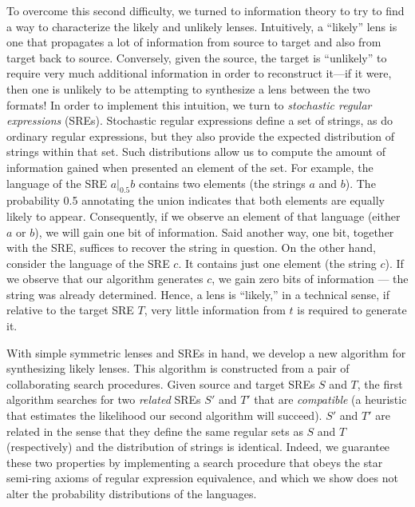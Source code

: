 \documentclass[acmsmall,screen,anonymous]{acmart}
\begin{document}
To overcome this second difficulty, we turned to information theory
to try to find a way to characterize the likely and unlikely lenses.  Intuitively, a ``likely'' lens
is one that propagates a lot of information from source to target and also from target
back to source.  Conversely, given the source, the target is ``unlikely'' to require very much
additional information in order to reconstruct it---if it were, then one is unlikely to
be attempting to synthesize a lens between the two formats!  In order to implement
this intuition, we turn to \emph{stochastic regular expressions} (SREs).
Stochastic regular expressions define a set of strings, as do ordinary regular expressions,
but they also provide the expected distribution of strings within that set.  Such
distributions allow us to compute the amount of information gained when presented
an element of the set.  For example, the language of the SRE $a |_{0.5} b$ contains two elements
(the strings $a$ and $b$).  The probability 0.5 annotating the union indicates that both
elements are equally likely to appear.  Consequently, if we observe 
an element of that language (either $a$ or $b$), we will gain one bit of information.  Said another way,
one bit, together with the SRE, suffices to recover the string in
question.
On the other hand, consider the language of the SRE $c$.
It contains just one element (the string $c$).  If we observe that our algorithm
generates $c$, we gain zero bits of information --- the string was already determined.
Hence, a lens is ``likely,'' in a technical sense, if relative to the target SRE $T$,
very little information from $t$ is required to generate it. 

With simple symmetric lenses and SREs in hand, we develop a new algorithm for synthesizing likely lenses.
This algorithm is constructed from a pair of collaborating search procedures.
Given source and target SREs $S$ and $T$, the first algorithm searches for two \emph{related} SREs
$S'$ and $T'$ that are \emph{compatible} (a heuristic that estimates the likelihood
our second algorithm will succeed).  $S'$ and $T'$ are related in the sense
that they define the same regular sets as $S$ and $T$ (respectively) and the distribution
of strings is identical.  Indeed, we guarantee these two properties by implementing
a search procedure that obeys the star semi-ring axioms of regular expression equivalence,
and which we show does not alter the probability distributions of the languages.
\end{document}
